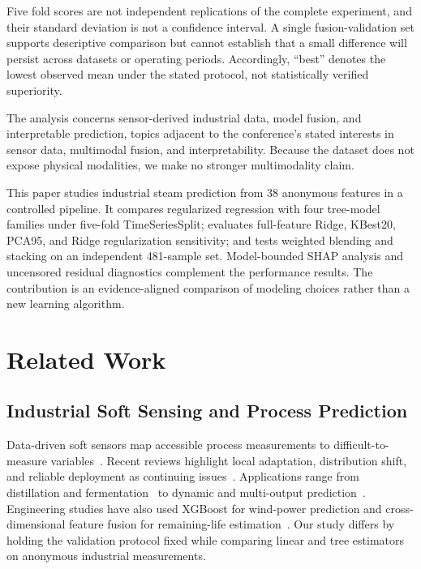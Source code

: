 \documentclass[sigconf,screen,review,anonymous]{acmart}
\begin{document}
Five fold scores are not independent replications of the complete experiment, and their standard deviation is not a confidence interval. A single fusion-validation set supports descriptive comparison but cannot establish that a small difference will persist across datasets or operating periods. Accordingly, ``best'' denotes the lowest observed mean under the stated protocol, not statistically verified superiority.

The analysis concerns sensor-derived industrial data, model fusion, and interpretable prediction, topics adjacent to the conference's stated interests in sensor data, multimodal fusion, and interpretability. Because the dataset does not expose physical modalities, we make no stronger multimodality claim.

This paper studies industrial steam prediction from 38 anonymous features in a controlled pipeline. It compares regularized regression with four tree-model families under five-fold TimeSeriesSplit; evaluates full-feature Ridge, KBest20, PCA95, and Ridge regularization sensitivity; and tests weighted blending and stacking on an independent 481-sample set. Model-bounded SHAP analysis and uncensored residual diagnostics complement the performance results. The contribution is an evidence-aligned comparison of modeling choices rather than a new learning algorithm.

\section{Related Work}
\subsection{Industrial Soft Sensing and Process Prediction}
Data-driven soft sensors map accessible process measurements to difficult-to-measure variables~\cite{kadlec2009softsensor}. Recent reviews highlight local adaptation, distribution shift, and reliable deployment as continuing issues~\cite{yeo2023jit,sheng2024review,perera2023ai_softsensor}. Applications range from distillation and fermentation~\cite{botha2021industrial_softsensor,hua2023rf_feature_selection} to dynamic and multi-output prediction~\cite{li2020seq2seq_lightgbm,wan2024wide_rf}. Engineering studies have also used XGBoost for wind-power prediction and cross-dimensional feature fusion for remaining-life estimation~\cite{wang2023zju_wind_xgboost,zhang2025zju_feature_fusion}. Our study differs by holding the validation protocol fixed while comparing linear and tree estimators on anonymous industrial measurements.
\end{document}
